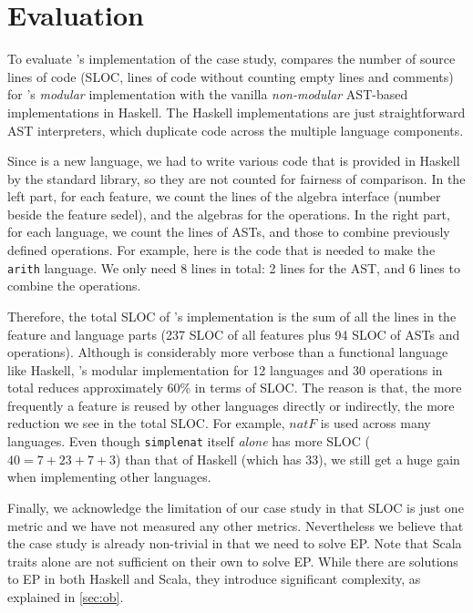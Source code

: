 \section{Evaluation}
\label{sec:evaluate}

To evaluate \name's implementation of the case study,
 compares the number of source lines of code
(SLOC, lines of code without counting empty lines and comments) for
\name's \emph{modular} implementation with the vanilla
\emph{non-modular} AST-based implementations in Haskell. The Haskell
implementations are just straightforward AST interpreters, which duplicate code across the multiple language
components.

Since \sedel is a new language, we
had to write various code that is provided in Haskell by the standard library,
so they are not counted for fairness of comparison. In the left part, for each
feature, we count the lines of the algebra interface (number beside the feature
sedel), and the algebras for the operations. In the right part, for each
language, we count the lines of ASTs, and those to combine previously
defined operations. For example, here is the code that is needed to make the
\lstinline{arith} language.
We only need 8 lines in total: 2 lines for the AST, and 6 lines to combine the operations.

Therefore, the total SLOC of \name's implementation is the sum of all the
lines in the feature and language parts (237 SLOC of all features plus 94 SLOC
of ASTs and operations). Although \sedel is considerably more verbose than a
functional language like Haskell, \name's modular implementation for 12 languages and 30
operations in total reduces approximately 60\% in terms of SLOC. The reason is
that, the more frequently a feature is reused by other languages directly or
indirectly, the more reduction we see in the total SLOC. For example,
$\mathit{natF}$ is used across many languages. Even though \lstinline{simplenat}
itself \emph{alone} has more SLOC ($40 = 7+23+7+3$) than that of Haskell (which
has 33), we still get a huge gain when implementing other languages.

Finally, we acknowledge the limitation of our case study in that SLOC is just
one metric and we have not measured any other metrics. Nevertheless we believe
that the case study is already non-trivial in that we need to solve EP. Note
that Scala traits alone are not sufficient on their own to solve EP. While there
are solutions to EP in both Haskell and Scala, they
introduce significant complexity, as explained in \cref{sec:ob}.



